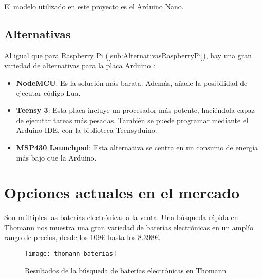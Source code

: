             El modelo utilizado en este proyecto es el Arduino Nano.
        

        \subsection{Alternativas} %
        \label{sub:AlternativasArduino}

            Al igual que para Raspberry Pi (\ref{sub:AlternativasRaspberryPi}), hay una gran variedad de alternativas
            para la placa Arduino \cite{alternativas_arduino}:

            \begin{itemize}
                \item \textbf{NodeMCU}: Es la solución más barata. Además, añade la posibilidad de ejecutar código Lua.
                \item \textbf{Teensy 3}: Esta placa incluye un procesador más potente, haciéndola capaz de ejecutar
                tareas más pesadas. También se puede programar mediante el Arduino IDE, con la biblioteca Teensyduino.
                \item \textbf{MSP430 Launchpad}: Esta alternativa se centra en un consumo de energía más bajo que la
                Arduino.
            \end{itemize}
        


    \section{Opciones actuales en el mercado} %
    \label{sec:OpcionesActualesEnElMercado}

        Son múltiples las baterías electrónicas a la venta. Una búsqueda rápida en Thomann \cite{thomann_baterias} nos
        muestra una gran variedad de baterías electrónicas en un amplío rango de precios, desde los 109\euro{} hasta los
        8.398\euro{}.

        \begin{figure}[ht]
            \centering
            \texttt{[image: thomann\_baterias]}
            \caption{Resultados de la búsqueda de baterías electrónicas en Thomann \cite{thomann_baterias}
                     \label{fig:ThomannBusqueda}}
        \end{figure}

